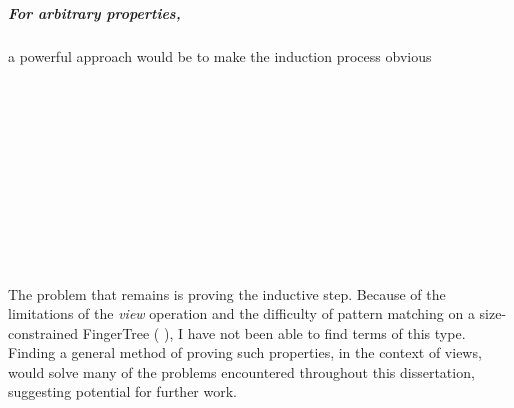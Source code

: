 \documentclass[12pt,twoside,notitlepage]{report}
\begin{document}
\subparagraph{For arbitrary properties,} a powerful approach would be to make the induction process obvious

\begin{code}
\\
\>[0]\<[6]%
\>[6] \AgdaSymbol{:}     \<%
\end{code}
\begin{code}
\\
\>[0]\<[6]%
\>[6] \AgdaSymbol{:}  \AgdaSymbol{\{} \AgdaSymbol{:} \AgdaSymbol{\}}\<%
\\
\>[6]\<[16]%
\>[16] \AgdaSymbol{(} \AgdaSymbol{:}   \AgdaSymbol{((} \AgdaSymbol{)}  \AgdaSymbol{))}\<%
\\
\>[6]\<[16]%
\>[16] \AgdaSymbol{(} \AgdaSymbol{:}  \AgdaSymbol{)}\<%
\\
\>[6]\<[16]%
\>[16] \AgdaSymbol{(} \AgdaSymbol{:}   \AgdaSymbol{)}\<%
\\
\>[6]\<[16]%
\>[16] \AgdaSymbol{(}     \AgdaSymbol{)}\<%
\\
\>[6]\<[16]%
\>[16] \AgdaSymbol{(} \AgdaSymbol{(} \AgdaSymbol{))}\<%
\\
\>[6]\<[16]%
\>[16] \AgdaSymbol{(} \AgdaSymbol{(} \AgdaSymbol{))}\<%
\\
\end{code}
The problem that remains is proving the inductive step. Because of the limitations of the \textit{view} operation and the difficulty of pattern matching on a size-constrained FingerTree (  \AgdaSymbol{((} \AgdaSymbol{)}  \AgdaSymbol{)}), I have not been able to find terms of this type. \\ Finding a general method of proving such properties, in the context of views\cite{wadler}, would solve many of the problems encountered throughout this dissertation, suggesting potential for further work.
\end{document}

